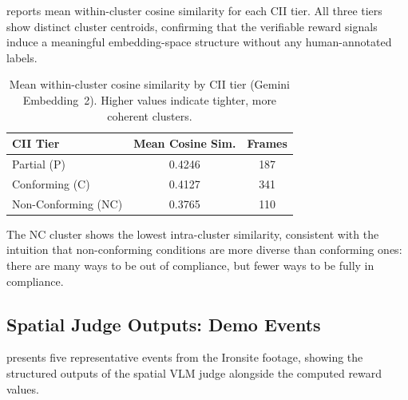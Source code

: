 \documentclass[sigconf,nonacm]{acmart}
\begin{document}
 reports mean within-cluster cosine similarity for
each CII tier.
All three tiers show distinct cluster centroids, confirming that the
verifiable reward signals induce a meaningful embedding-space structure
without any human-annotated labels.

\begin{table}[t]
  \centering
  \caption{Mean within-cluster cosine similarity by CII tier
           (Gemini Embedding~2). Higher values indicate tighter,
           more coherent clusters.}
  \label{tab:embedding}
  \begin{tabular}{@{}lcc@{}}
    \toprule
    \textbf{CII Tier} & \textbf{Mean Cosine Sim.} & \textbf{Frames} \\
    \midrule
    Partial (P)         & 0.4246 & 187 \\
    Conforming (C)      & 0.4127 & 341 \\
    Non-Conforming (NC) & 0.3765 & 110 \\
    \bottomrule
  \end{tabular}
\end{table}

The NC cluster shows the lowest intra-cluster similarity, consistent with
the intuition that non-conforming conditions are more diverse than
conforming ones: there are many ways to be out of compliance, but fewer
ways to be fully in compliance.

\subsection{Spatial Judge Outputs: Demo Events}
\label{sec:events}

 presents five representative events from the Ironsite
footage, showing the structured outputs of the spatial VLM judge alongside
the computed reward values.
\end{document}
